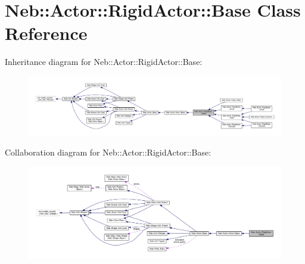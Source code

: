 \hypertarget{classNeb_1_1Actor_1_1RigidActor_1_1Base}{\section{Neb\-:\-:Actor\-:\-:Rigid\-Actor\-:\-:Base Class Reference}
\label{classNeb_1_1Actor_1_1RigidActor_1_1Base}
}


Inheritance diagram for Neb\-:\-:Actor\-:\-:Rigid\-Actor\-:\-:Base\-:
\nopagebreak
\begin{figure}[H]
\begin{center}
\leavevmode
\includegraphics[width=350pt]{classNeb_1_1Actor_1_1RigidActor_1_1Base__inherit__graph}
\end{center}
\end{figure}


Collaboration diagram for Neb\-:\-:Actor\-:\-:Rigid\-Actor\-:\-:Base\-:
\nopagebreak
\begin{figure}[H]
\begin{center}
\leavevmode
\includegraphics[width=350pt]{classNeb_1_1Actor_1_1RigidActor_1_1Base__coll__graph}
\end{center}
\end{figure}
